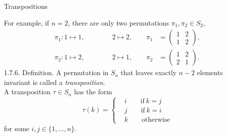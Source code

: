 \documentclass[smaller,hyperref={CJKbookmarks=true}]{beamer}
\begin{document}
\begin{frame}[t,shrink]{Transpositions}
\begin{spacing}{1}
For example, if $n=2$, there are only two permutations $\pi_1,\pi_2\in S_2$,
\begin{equation}\label{1.7.12}
\begin{aligned}
\pi_{1}:1\mapsto 1,\qquad\qquad 2\mapsto 2,\qquad \pi_1&=\begin{pmatrix}1&2\\1&2\end{pmatrix},\\
\pi_{2}:1\mapsto 2,\qquad\qquad 2\mapsto 1,\qquad \pi_{2}&=\begin{pmatrix}1&2\\2&1\end{pmatrix}.
\end{aligned}
\end{equation}
\alert{1.7.6. Definition.} A permutation in $S_n$ that leaves exactly $n-2$ elements invariant is called a \emph{transposition}.\\[6pt]
A transposition $\tau\in S_n$ has the form
\begin{equation}\label{1.7.13}
\tau(k)=\left\{\begin{aligned}&i\qquad\text{if}~k=j\\
&j\qquad\text{if}~k=i\\
&k\qquad\text{otherwise}\end{aligned}\right.
\end{equation}
for some $i,j\in\{1,\ldots,n\}$.
\end{spacing}
\end{frame}
\end{document}
